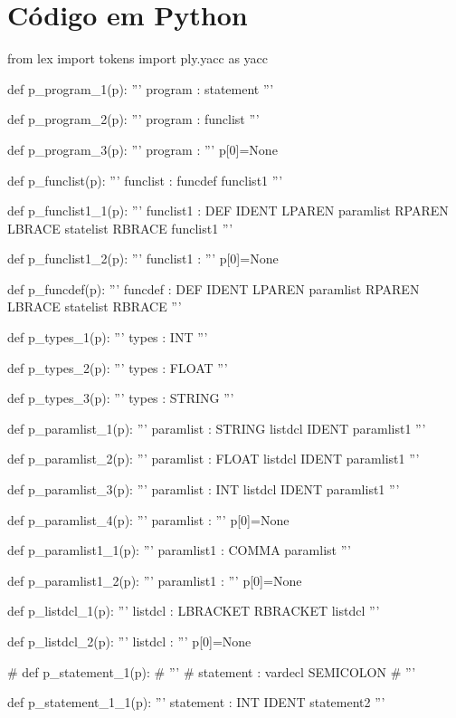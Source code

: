 \documentclass[
	12pt,				%
	openright,			%
	twoside,			%
	a4paper,			%
	english,			%
	french,				%
	spanish,			%
	brazil				%
	]{abntex2}
\begin{document}
\section{Código em Python}
\begin{python}
from lex import tokens
import ply.yacc as yacc


def p_program_1(p):
    '''
    program : statement
    '''

def p_program_2(p):
    '''
    program : funclist
    '''

def p_program_3(p):
    '''
    program : 
    '''
    p[0]=None

def p_funclist(p):
    '''
    funclist : funcdef funclist1
    '''

def p_funclist1_1(p):
    '''
    funclist1 : DEF IDENT LPAREN paramlist RPAREN LBRACE statelist RBRACE funclist1
    '''

def p_funclist1_2(p):
    '''
    funclist1 : 
    '''
    p[0]=None

def p_funcdef(p):
    '''
    funcdef : DEF IDENT LPAREN paramlist RPAREN LBRACE statelist RBRACE
    '''

def p_types_1(p):
    '''
    types : INT
    '''

def p_types_2(p):
    '''
    types : FLOAT
    '''

def p_types_3(p):
    '''
    types : STRING
    '''

def p_paramlist_1(p):
    '''
    paramlist : STRING listdcl IDENT paramlist1 
    '''

def p_paramlist_2(p):
    '''
    paramlist : FLOAT listdcl IDENT paramlist1 
    '''

def p_paramlist_3(p):
    '''
    paramlist : INT listdcl IDENT paramlist1 
    '''

def p_paramlist_4(p):
    '''
    paramlist : 
    '''
    p[0]=None

def p_paramlist1_1(p):
    '''
    paramlist1 : COMMA paramlist
    '''

def p_paramlist1_2(p):
    '''
    paramlist1 : 
    '''
    p[0]=None

def p_listdcl_1(p):
    '''
    listdcl : LBRACKET RBRACKET listdcl
    '''

def p_listdcl_2(p):
    '''
    listdcl : 
    '''
    p[0]=None

# def p_statement_1(p):
#     '''
#     statement : vardecl SEMICOLON
#     '''

def p_statement_1_1(p):
    '''
    statement : INT IDENT statement2
    '''


\end{python}
\end{document}
